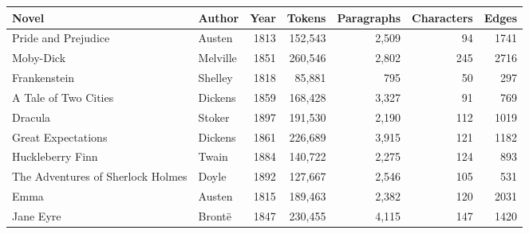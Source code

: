 \begin{tabular}{llrrrrr}
\toprule
Novel & Author & Year & Tokens & Paragraphs & Characters & Edges \\
\midrule
Pride and Prejudice & Austen & 1813 & 152{,}543 & 2{,}509 & 94 & 1741 \\
Moby-Dick & Melville & 1851 & 260{,}546 & 2{,}802 & 245 & 2716 \\
Frankenstein & Shelley & 1818 & 85{,}881 & 795 & 50 & 297 \\
A Tale of Two Cities & Dickens & 1859 & 168{,}428 & 3{,}327 & 91 & 769 \\
Dracula & Stoker & 1897 & 191{,}530 & 2{,}190 & 112 & 1019 \\
Great Expectations & Dickens & 1861 & 226{,}689 & 3{,}915 & 121 & 1182 \\
Huckleberry Finn & Twain & 1884 & 140{,}722 & 2{,}275 & 124 & 893 \\
The Adventures of Sherlock Holmes & Doyle & 1892 & 127{,}667 & 2{,}546 & 105 & 531 \\
Emma & Austen & 1815 & 189{,}463 & 2{,}382 & 120 & 2031 \\
Jane Eyre & Brontë & 1847 & 230{,}455 & 4{,}115 & 147 & 1420 \\
\bottomrule
\end{tabular}